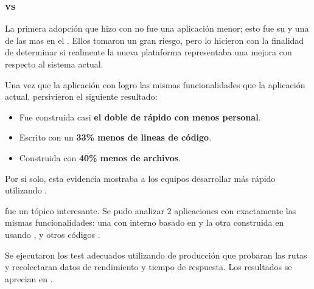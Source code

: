 \subsubsection{\nodejsNAME vs \javaNAME \cite{online_nodejs_paypal}}



La primera adopción que hizo \paypalNAME con \nodejsNAME no fue una aplicación menor; esto fue su \accountOverviewPageINT y una de las mas \traffickedINT \appsINT en el \websiteINT. Ellos tomaron un gran riesgo, pero lo hicieron con la finalidad de determinar si realmente la nueva plataforma representaba una mejora con respecto al sistema actual.

Una vez que la aplicación con \nodejsNAME logro las mismas funcionalidades que la aplicación actual, persivieron el siguiente resultado:

\begin{itemize}
\item Fue construida casi \textbf{el doble de rápido con menos personal}.
\item Escrito con un \textbf{33\% menos de lineas de código}.
\item Construida con \textbf{40\% menos de archivos}.
\end{itemize}

Por si solo, esta evidencia mostraba a los equipos desarrollar más rápido utilizando \javaScriptNAME.

\performanceQA fue un tópico interesante. Se pudo analizar 2 aplicaciones con exactamente las mismas funcionalidades: una con \framework \javaNAME interno basado en \javaSpringNAME y la otra construida en \krakenjsNAME usando \expressjsNAME, \dustjsNAME y otros códigos \openSourcePC.

Se ejecutaron los test adecuados utilizando \hardwarePC de producción que probaran las rutas y recolectaran datos de rendimiento y tiempo de respuesta. Los resultados se aprecian en .

